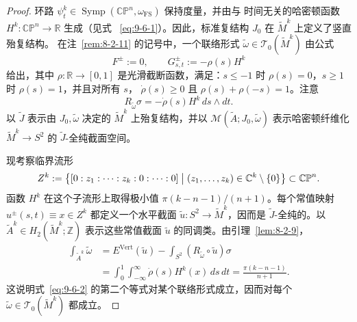 \begin{proof}
环路
$\psi_t^k\in\operatorname{Symp}(\mathbb{CP}^n,\omega_{\mathrm{FS}})$ 保持度量，并由与
时间无关的哈密顿函数 $H^k:\mathbb{CP}^n\to\mathbb R$ 生成（见式
~\eqref{eq:9-6-1}）。因此，标准复结构 $J_0$ 在 $\widetilde M^k$ 上定义了竖直殆复结构。
在注~\ref{rem:8-2-11} 的记号中，一个联络形式
$\widetilde\omega\in\mathcal T_0(\widetilde M^k)$ 由公式
\begin{equation}\label{eq:9-6-3}
  F^\pm:=0,
  \qquad G_{s,t}^\pm:=-\rho(s)H^k
\end{equation}
给出，其中 $\rho:\mathbb R\to[0,1]$ 是光滑截断函数，满足：$s\le-1$ 时
$\rho(s)=0$，$s\ge1$ 时 $\rho(s)=1$，并且对所有 $s$，
$\dot\rho(s)\ge0$ 且 $\rho(s)+\rho(-s)=1$。注意
\[
  R_{\widetilde\omega}\sigma=-\dot\rho(s)H^k\,ds\wedge dt.
\]
以 $\widetilde J$ 表示由 $J_0,\widetilde\omega$ 决定的 $\widetilde M^k$ 上殆复结构，并以
$\mathcal M(\widetilde A;J_0,\widetilde\omega)$ 表示哈密顿纤维化
$\widetilde M^k\to S^2$ 的 $\widetilde J$-全纯截面空间。

现考察临界流形
\[
  Z^k:=\bigl\{[0:z_1:\cdots:z_k:0:\cdots:0]
  \bigm|(z_1,\ldots,z_k)\in\mathbb C^k\setminus\{0\}\bigr\}
  \subset\mathbb{CP}^n.
\]
函数 $H^k$ 在这个子流形上取得极小值
$\pi(k-n-1)/(n+1)$。每个常值映射
$u^\pm(s,t)\equiv x\in Z^k$ 都定义一个水平截面
$\widetilde u:S^2\to\widetilde M^k$，因而是 $\widetilde J$-全纯的。以
$\widetilde A^k\in H_2(\widetilde M^k;\mathbb Z)$ 表示这些常值截面
$\widetilde u$ 的同调类。由引理~\ref{lem:8-2-9}，
\[
\begin{aligned}
  \int_{\widetilde A^k}\widetilde\omega
  &=E^{\mathrm{Vert}}(\widetilde u)
    -\int_{S^2}(R_{\widetilde\omega}\circ\widetilde u)\sigma\\
  &=\int_0^1\int_{-\infty}^{\infty}
      \dot\rho(s)H^k(x)\,ds\,dt
   =\frac{\pi(k-n-1)}{n+1}.
\end{aligned}
\]
这说明式~\eqref{eq:9-6-2} 的第二个等式对某个联络形式成立，因而对每个
$\widetilde\omega\in\mathcal T_0(\widetilde M^k)$ 都成立。


\end{proof}
